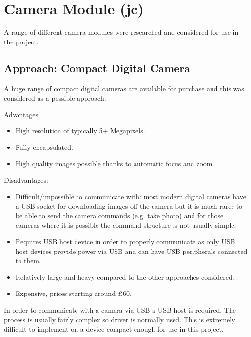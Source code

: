
\section{Camera Module (jc)}
\label{sec:John_options}

A range of different camera modules were researched and considered for use in the project.

\subsection{Approach: Compact Digital Camera}
\label{sec:Compact_option}
A huge range of compact digital cameras are available for purchase and this was considered as a possible approach.

Advantages:
      \begin{itemize}
         \item High resolution of typically 5+ Megapixels.
		 \item Fully encapsulated.
		 \item High quality images possible thanks to automatic focus and zoom.
     \end{itemize}

Disadvantages:
     \begin{itemize}
        \item Difficult/impossible to communicate with: most modern digital cameras have a USB socket for downloading images off the camera but it is much rarer to be able to send the camera commands (e.g. take photo) and for those cameras where it is possible the command structure is not usually simple.
        \item Requires USB host device in order to properly communicate as only USB host devices provide power via USB and can have USB peripherals connected to them.
	\item Relatively large and heavy compared to the other approaches considered.
	\item Expensive, prices starting around \pounds 60.
     \end{itemize}

In order to communicate with a camera via USB a USB host is required. The process is usually fairly complex so driver is normally used. This is extremely difficult to implement on a device compact enough for use in this project.

